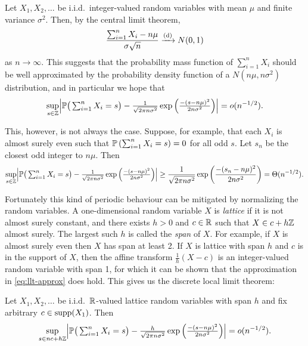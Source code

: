 Let $X_1, X_2, \ldots$ be i.i.d.\ integer-valued random variables with mean $\mu$ and finite variance $\sigma^2$. Then, by the central limit theorem,
\begin{equation*}
    \frac{ \sum_{i=1}^n X_i - n \mu }{\sigma \sqrt{n}}
    \todist
    N(0, 1)
\end{equation*}
as $n \to \infty$. This suggests that the probability mass function of $\sum_{i=1}^n X_i$ should be well approximated by the probability density function of a $N(n \mu, n \sigma^2)$ distribution, and in particular we hope that
\begin{equation}
    \label{eq:llt-approx}
    \sup_{s \in \Z} \abs*{
        \P\big( \textstyle \sum_{i=1}^n X_i = s \big) 
        -
        \frac{1}{\sqrt{2 \pi n \sigma^2}}  \exp \left(
            \frac{-(s - n \mu)^2}{2 n \sigma^2}
        \right)
    } = \littleo(n^{-1/2}).
\end{equation}

This, however, is not always the case. Suppose, for example, that each $X_i$ is almost surely even such that $\P\left( \sum_{i=1}^n X_i = s \right) = 0$ for all odd $s$. Let $s_n$ be the closest odd integer to $n \mu$. Then
\begin{equation*}
    \sup_{s \in \Z} \abs*{
        \P\big( \textstyle \sum_{i=1}^n X_i = s \big) 
        -
        \frac{1}{\sqrt{2 \pi n \sigma^2}}  \exp \left(
            \frac{-(s - n \mu)^2}{2 n \sigma^2}
        \right)
    }
    \geq
    \frac{1}{\sqrt{2 \pi n \sigma^2}}  \exp \left(
        \frac{-(s_n - n \mu)^2}{2 n \sigma^2}
    \right)
    = 
    \Theta(n^{ -1/2 }).
\end{equation*}

Fortunately this kind of periodic behaviour can be mitigated by normalizing the random variables. A one-dimensional random variable $X$ is \emph{lattice} if it is not almost surely constant, and there exists $h > 0$ and $c \in \R$ such that $X \in c + h\Z$ almost surely. The largest such $h$ is called the \emph{span} of $X$. For example, if $X$ is almost surely even then $X$ has span at least 2. If $X$ is lattice with span $h$ and $c$ is in the support of $X$, then the affine transform $\frac{1}{h}(X - c)$ is an integer-valued random variable with span 1, for which it can be shown that the approximation in \cref{eq:llt-approx} does hold. This gives us the discrete local limit theorem:
\begin{theorem}
    \label{thm:discrete-llt}
    Let $X_1, X_2, \ldots$ be i.i.d.\ $\R$-valued lattice random variables with span $h$ and fix arbitrary $c \in \supp(X_1)$. Then
    \begin{equation*}
        \sup_{s \in n c + h \Z} \abs*{
            \P\big( \textstyle \sum_{i=1}^n X_i = s \big) 
            -
            \frac{h}{\sqrt{2 \pi n \sigma^2}}  \exp \left(
                \frac{-(s - n \mu)^2}{2 n \sigma^2}
            \right)
        } = \littleo(n^{-1/2}).
    \end{equation*}
\end{theorem}


